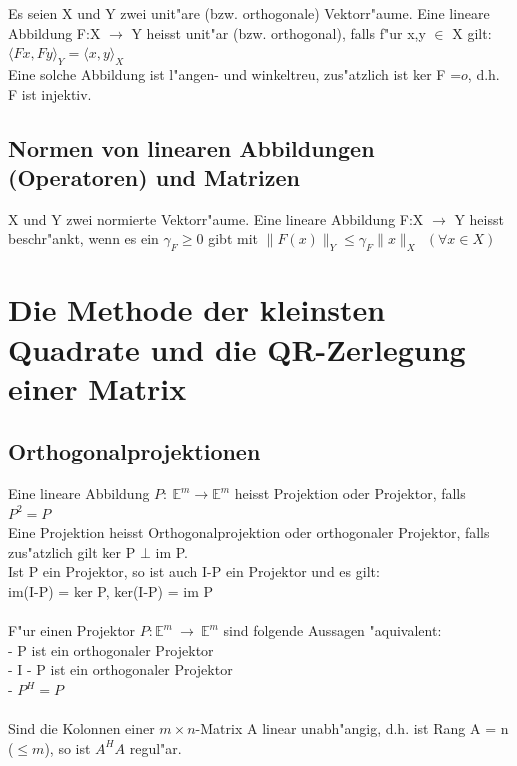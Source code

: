 \documentclass[10pt, a4paper, twocolumn]{scrartcl}
\begin{document}
Es seien X und Y zwei unit"are (bzw. orthogonale) Vektorr"aume. Eine lineare Abbildung F:X $\rightarrow$ Y heisst unit"ar (bzw. orthogonal), falls f"ur x,y $\in$ X gilt:\\
$\langle Fx,Fy \rangle_Y=\langle x,y\rangle_X$\\
Eine solche Abbildung ist l"angen- und winkeltreu, zus"atzlich ist ker F =${o}$, d.h. F ist injektiv.

\subsection{Normen von linearen Abbildungen (Operatoren) und Matrizen}

X und Y zwei normierte Vektorr"aume. Eine lineare Abbildung F:X $\rightarrow$ Y heisst beschr"ankt, wenn es ein $\gamma_F\geq0$ gibt mit $\|F(x)\|_Y\leq\gamma_F\|x\|_X\:\:(\forall x \in X)$ 



\section{Die Methode der kleinsten Quadrate und die QR-Zerlegung einer Matrix}

\subsection{Orthogonalprojektionen}

Eine lineare Abbildung $P:\:\mathbb{E}^m\rightarrow\mathbb{E}^m$ heisst Projektion oder Projektor, falls $P^2=P$\\
Eine Projektion heisst Orthogonalprojektion oder orthogonaler Projektor, falls zus"atzlich gilt ker P $\bot$ im P.\\
Ist P ein Projektor, so ist auch I-P ein Projektor und es gilt:\\
im(I-P) = ker P, ker(I-P) = im P\\\\

F"ur einen Projektor $P: \mathbb{E}^m\:\rightarrow\:\mathbb{E}^m$ sind folgende Aussagen "aquivalent:\\
- P ist ein orthogonaler Projektor\\
- I - P ist ein orthogonaler Projektor\\
- $P^H=P$\\\\


Sind die Kolonnen einer $m\times n$-Matrix A linear unabh"angig, d.h. ist Rang A = n ($\leq m$), so ist $A^HA$ regul"ar.\\\\
\end{document}
